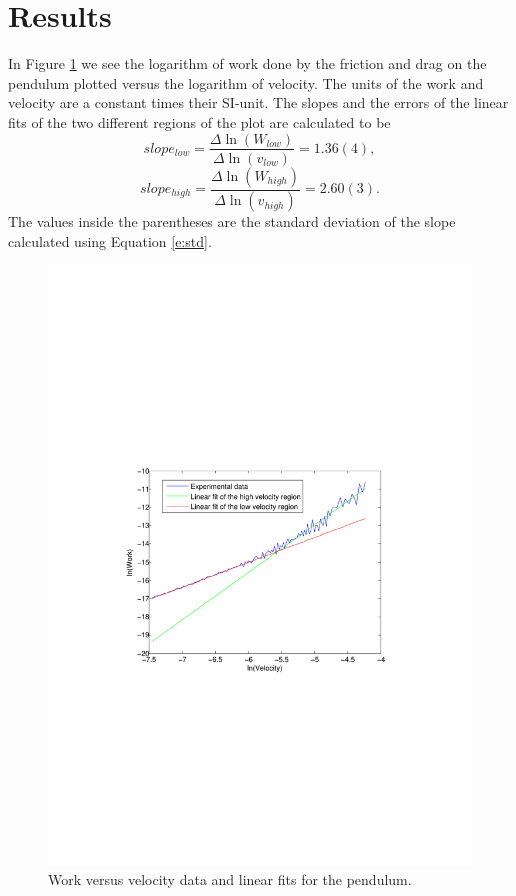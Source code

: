 \documentclass[11pt, a4paper]{article}
\begin{document}
\section{Results}
In Figure \ref{f:nopaper} we see the logarithm of work done by the friction and 
drag on the pendulum plotted versus the logarithm of velocity. 
The units of the work and velocity are a constant times their SI-unit. 
The slopes and the errors of the linear fits of the two different regions of the 
plot are calculated to be
\[
	slope_{low}=\frac{\Delta\ln(W_{low})}{\Delta\ln(v_{low})} = 1.36(4),
\]\[
	slope_{high}=\frac{\Delta\ln(W_{high})}{\Delta\ln(v_{high})} = 2.60(3).
\]
The values inside the parentheses are the standard deviation of the slope 
calculated using Equation \ref{e:std}.

\begin{figure}[h]
	\centering
	\includegraphics[trim=10.0cm 10.0cm 10.0cm 10.0cm, scale=0.7]{no_paper}
	\caption{Work versus velocity data and  linear fits for the pendulum.}
	\label{f:nopaper}
\end{figure}
\end{document}
